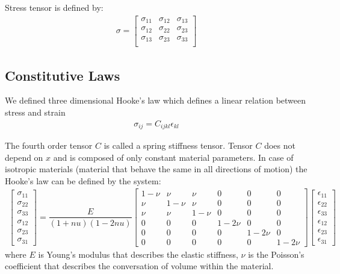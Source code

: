 \documentclass[en]{minipw} %
\begin{document}
Stress tensor is defined by:
\begin{equation}
\begin{aligned}
\sigma =
\begin{bmatrix}
\sigma_{11} & \sigma_{12} & \sigma_{13} \\
\sigma_{12} & \sigma_{22} & \sigma_{23} \\
\sigma_{13} & \sigma_{23} & \sigma_{33} \\
\end{bmatrix}
\end{aligned}
\end{equation}

\subsection{Constitutive Laws}
We defined three dimensional Hooke's law which defines a linear relation between stress and strain
\begin{equation}
\begin{aligned}
\sigma_{ij} = C_{ijkl}\epsilon_{kl}
\end{aligned}
\end{equation}

The fourth order tensor $C$ is called a spring stiffness tensor. Tensor $C$ does not depend on $x$ and is composed of only constant material parameters. In case of isotropic materials (material that behave the same in all directions of motion) the Hooke's law can be defined by the system:
\begin{equation}
\begin{aligned}
\begin{bmatrix}
\sigma_{11} \\
\sigma_{22} \\
\sigma_{33} \\
\sigma_{12} \\
\sigma_{23} \\
\sigma_{31}
\end{bmatrix}
=
\dfrac{E}{(1+ nu)(1 - 2 nu)}
\begin{bmatrix}
1 - \nu & \nu & \nu & 0 & 0 & 0 \\
\nu & 1 - \nu &  \nu & 0 & 0 & 0 \\
\nu & \nu & 1 - \nu & 0 & 0 & 0 \\
0 & 0 & 0 & 1 - 2 \nu & 0 & 0 \\
0 & 0 & 0 & 0 & 1 - 2 \nu & 0 \\
0 & 0 & 0 & 0 & 0 & 1 - 2 \nu
\end{bmatrix}
\begin{bmatrix}
\epsilon_{11} \\
\epsilon_{22} \\
\epsilon_{33} \\
\epsilon_{12} \\
\epsilon_{23} \\
\epsilon_{31}
\end{bmatrix}
\end{aligned}
\end{equation}
where $E$ is Young's modulus that describes the elastic stiffness, $\nu$ is the Poisson's coefficient that describes the conversation of volume within the material.
\end{document}
